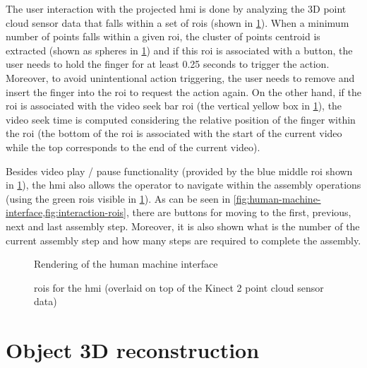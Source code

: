 The user interaction with the projected \gls{hmi} is done by analyzing the 3D point cloud sensor data that falls within a set of \glspl{roi} (shown in \cref{fig:interaction-rois}). When a minimum number of points falls within a given \gls{roi}, the cluster of points centroid is extracted (shown as spheres in \cref{fig:interaction-rois}) and if this \gls{roi} is associated with a button, the user needs to hold the finger for at least 0.25 seconds to trigger the action. Moreover, to avoid unintentional action triggering, the user needs to remove and insert the finger into the \gls{roi} to request the action again. On the other hand, if the \gls{roi} is associated with the video seek bar \gls{roi} (the vertical yellow box in \cref{fig:interaction-rois}), the video seek time is computed considering the relative position of the finger within the \gls{roi} (the bottom of the \gls{roi} is associated with the start of the current video while the top corresponds to the end of the current video).

Besides video play / pause functionality (provided by the blue middle \gls{roi} shown in \cref{fig:interaction-rois}), the \gls{hmi} also allows the operator to navigate within the assembly operations (using the green \glspl{roi} visible in \cref{fig:interaction-rois}). As can be seen in \cref{fig:human-machine-interface,fig:interaction-rois}, there are buttons for moving to the first, previous, next and last assembly step. Moreover, it is also shown what is the number of the current assembly step and how many steps are required to complete the assembly.

\begin{figure}[H]
	\begin{floatrow}[2]
		{\caption{Rendering of the human machine interface}\label{fig:human-machine-interface}}
		{\caption{\glspl{roi} for the \gls{hmi} (overlaid on top of the Kinect 2 point cloud sensor data)}\label{fig:interaction-rois}}
	\end{floatrow}
\end{figure}


\section{Object 3D reconstruction}\label{sec:object-reconstruction}

